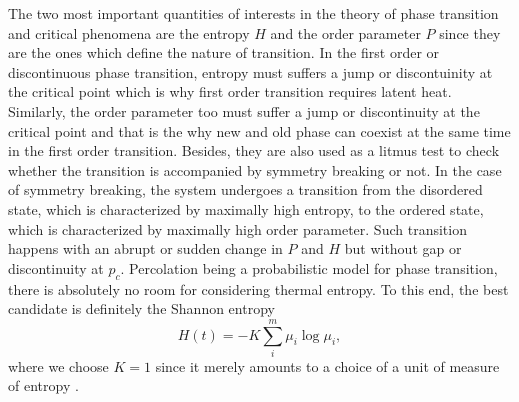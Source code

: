 	The two most important quantities of interests in the theory of phase transition and critical phenomena 
	are the entropy $H$ and the order parameter $P$ since they are the ones
	which define the nature of transition. In the first order or discontinuous phase transition,
	entropy must suffers a jump or discontuinity at the critical point which is 
	why first order transition
	requires latent heat. Similarly, the order parameter too must suffer a jump or discontinuity at
	the critical point and that is the why new and old 
	phase can coexist at the same time in the first order transition. Besides, they are also used as a litmus test to check
	whether the transition is accompanied by symmetry breaking or not. In the case of symmetry breaking,
	the system undergoes a transition from the disordered state, which is characterized by maximally high
	entropy, to the ordered state, which is characterized by maximally high order parameter. 
	Such transition happens with an abrupt or sudden
	change in $P$ and $H$ but without gap or discontinuity at $p_c$. 
	Percolation being a probabilistic model for phase transition, there is
	absolutely no room for considering thermal entropy. To this end, the 
	best candidate is definitely the Shannon entropy  
	\begin{equation}
	\label{eq:shannon_entropy}
	H(t)=-K\sum_i^m \mu_i\log \mu_i,
	\end{equation} 
	where we choose $K=1$ since it merely amounts to a choice of a unit of measure of entropy \cite{Shannon1948}. 
	
	
	
